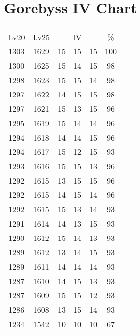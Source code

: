 \documentclass{article}%
\begin{document}
%
\normalsize%
\section{Gorebyss IV Chart}%
\label{sec:Gorebyss IV Chart}%
\renewcommand{\arraystretch}{1.5}%
\begin{tabular}{|c|c|c|c|c|c|}%
\hline%
\multicolumn{6}{|c|}{\textcolor{white}{ 
\linebreak{Gorebyss}
}%
\cellcolor{black}}\\%
\multicolumn{1}{|c}{Lv20}&\multicolumn{1}{c|}{Lv25}&\multicolumn{3}{c|}{IV}&\multicolumn{1}{|c|}{\%}\\%
\hline%
\rowcolor{color100}%
1303&1629&15&15&15&100\\%
\hline%
\rowcolor{color98}%
1300&1625&15&14&15&98\\%
\hline%
\rowcolor{color98}%
1298&1623&15&15&14&98\\%
\hline%
\rowcolor{color98}%
1297&1622&14&15&15&98\\%
\hline%
\rowcolor{color96}%
1297&1621&15&13&15&96\\%
\hline%
\rowcolor{color96}%
1295&1619&15&14&14&96\\%
\hline%
\rowcolor{color96}%
1294&1618&14&14&15&96\\%
\hline%
\rowcolor{color93}%
1294&1617&15&12&15&93\\%
\hline%
\rowcolor{color96}%
1293&1616&15&15&13&96\\%
\hline%
\rowcolor{color96}%
1292&1615&13&15&15&96\\%
\hline%
\rowcolor{color96}%
1292&1615&14&15&14&96\\%
\hline%
\rowcolor{color93}%
1292&1615&15&13&14&93\\%
\hline%
\rowcolor{color93}%
1291&1614&14&13&15&93\\%
\hline%
\rowcolor{color93}%
1290&1612&15&14&13&93\\%
\hline%
\rowcolor{color93}%
1289&1612&13&14&15&93\\%
\hline%
\rowcolor{color93}%
1289&1611&14&14&14&93\\%
\hline%
\rowcolor{color93}%
1287&1610&14&15&13&93\\%
\hline%
\rowcolor{color93}%
1287&1609&15&15&12&93\\%
\hline%
\rowcolor{color93}%
1286&1608&13&15&14&93\\%
\hline%
\rowcolor{color91}%
1234&1542&10&10&10&67\\%
\end{tabular}

%
\end{document}
